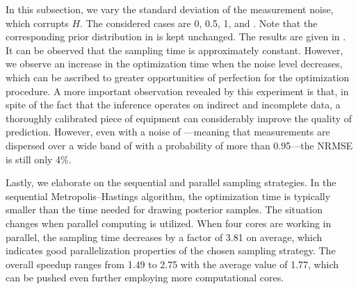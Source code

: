 
In this subsection, we vary the standard deviation of the measurement noise,
which corrupts $H$. The considered cases are 0, 0.5, 1, and 
\cite{mesa-martinez2007}. Note that the corresponding prior distribution in
 is kept unchanged. The results are given in
. It can be observed that the sampling time is
approximately constant. However, we observe an increase in the optimization time
when the noise level decreases, which can be ascribed to greater opportunities
of perfection for the optimization procedure. A more important observation
revealed by this experiment is that, in spite of the fact that the inference
operates on indirect and incomplete data, a thoroughly calibrated piece of
equipment can considerably improve the quality of prediction. However, even with
a noise of ---meaning that measurements are dispersed over a wide
band of  with a probability of more than 0.95---the \ac{NRMSE} is
still only 4\%.


Lastly, we elaborate on the sequential and parallel sampling strategies. In the
sequential Metropolis--Hastings algorithm, the optimization time is typically
smaller than the time needed for drawing posterior samples. The situation
changes when parallel computing is utilized. When four cores are working in
parallel, the sampling time decreases by a factor of 3.81 on average, which
indicates good parallelization properties of the chosen sampling strategy. The
overall speedup ranges from 1.49 to 2.75 with the average value of 1.77, which
can be pushed even further employing more computational cores.
